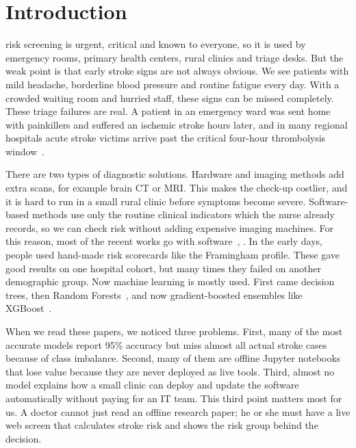 \documentclass[10pt,journal,compsoc]{IEEEtran}
\begin{document}
\maketitle
\IEEEdisplaynontitleabstractindextext
\IEEEpeerreviewmaketitle

\section{Introduction}
 risk screening is urgent, critical and known to everyone, so it is used by emergency rooms, primary health centers, rural clinics and triage desks. But the weak point is that early stroke signs are not always obvious. We see patients with mild headache, borderline blood pressure and routine fatigue every day. With a crowded waiting room and hurried staff, these signs can be missed completely. These triage failures are real. A patient in an emergency ward was sent home with painkillers and suffered an ischemic stroke hours later, and in many regional hospitals acute stroke victims arrive past the critical four-hour thrombolysis window~\cite{buhai2026}.

There are two types of diagnostic solutions. Hardware and imaging methods add extra scans, for example brain CT or MRI. This makes the check-up costlier, and it is hard to run in a small rural clinic before symptoms become severe. Software-based methods use only the routine clinical indicators which the nurse already records, so we can check risk without adding expensive imaging machines. For this reason, most of the recent works go with software~\cite{buhai2026}, \cite{paleyes2022}. In the early days, people used hand-made risk scorecards like the Framingham profile. These gave good results on one hospital cohort, but many times they failed on another demographic group. Now machine learning is mostly used. First came decision trees, then Random Forests~\cite{chawla2002}, and now gradient-boosted ensembles like XGBoost~\cite{laurikkala2001}.

When we read these papers, we noticed three problems. First, many of the most accurate models report 95\% accuracy but miss almost all actual stroke cases because of class imbalance. Second, many of them are offline Jupyter notebooks that lose value because they are never deployed as live tools. Third, almost no model explains how a small clinic can deploy and update the software automatically without paying for an IT team. This third point matters most for us. A doctor cannot just read an offline research paper; he or she must have a live web screen that calculates stroke risk and shows the risk group behind the decision.
\end{document}
